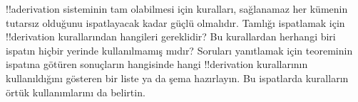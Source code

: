\documentclass[../../../include/open-logic-section]{subfiles}
\begin{document}
\begin{prob}
!!a{derivation} sisteminin tam olabilmesi için kuralları, sağlanamaz
her kümenin tutarsız olduğunu ispatlayacak kadar güçlü olmalıdır.
Tamlığı ispatlamak için !!{derivation} kurallarından hangileri
gereklidir? Bu kurallardan herhangi biri ispatın hiçbir yerinde
kullanılmamış mıdır? Soruları yanıtlamak için
 teoreminin ispatına götüren
sonuçların hangisinde hangi !!{derivation} kurallarının kullanıldığını
gösteren bir liste ya da şema hazırlayın. Bu ispatlarda kuralların
örtük kullanımlarını da belirtin.
\end{prob}
\tagendprob
\end{document}
